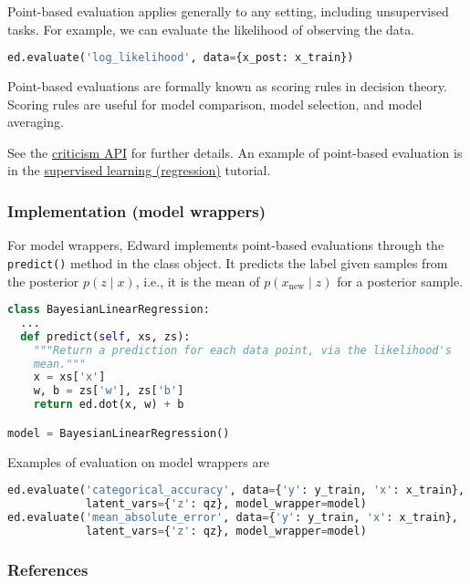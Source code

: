 Point-based evaluation applies generally to any setting, including
unsupervised tasks. For example, we can evaluate the likelihood of
observing the data.
\begin{lstlisting}[language=Python]
ed.evaluate('log_likelihood', data={x_post: x_train})
\end{lstlisting}

Point-based evaluations are formally known as scoring rules
in decision theory. Scoring rules are useful for model comparison, model
selection, and model averaging.

See the \href{api/criticisms}{criticism API} for further details.
An example of point-based evaluation is in the
\href{tut_supervised_regression}{supervised learning
(regression)} tutorial.

\subsubsection{Implementation (model wrappers)}

For model wrappers, Edward implements point-based evaluations through
the \texttt{predict()} method in the class object. It predicts
the label given samples from the posterior $p(z \mid x)$, i.e., it is
the mean of $p(x_\text{new} \mid z)$ for a posterior sample.
\begin{lstlisting}[language=Python]
class BayesianLinearRegression:
  ...
  def predict(self, xs, zs):
    """Return a prediction for each data point, via the likelihood's
    mean."""
    x = xs['x']
    w, b = zs['w'], zs['b']
    return ed.dot(x, w) + b

model = BayesianLinearRegression()
\end{lstlisting}
Examples of evaluation on model wrappers are
\begin{lstlisting}[language=Python]
ed.evaluate('categorical_accuracy', data={'y': y_train, 'x': x_train},
            latent_vars={'z': qz}, model_wrapper=model)
ed.evaluate('mean_absolute_error', data={'y': y_train, 'x': x_train},
            latent_vars={'z': qz}, model_wrapper=model)
\end{lstlisting}

\subsubsection{References}\label{references}
